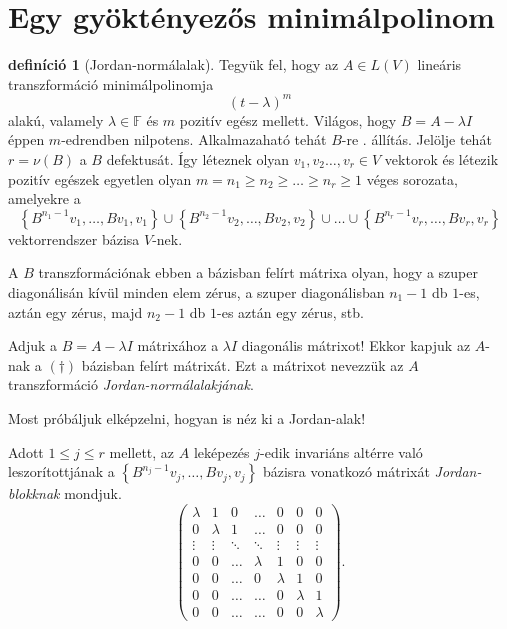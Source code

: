 \documentclass[a4paper, showtrims]{memoir}
\theoremstyle{plain}
\theoremstyle{remark}
\theoremstyle{definition}
\newtheorem{definition}[proposition]{definíció}
\begin{document}
\section{Egy gyöktényezős minimálpolinom}
\begin{definition}[Jordan-normálalak]
	Tegyük fel, hogy az $A\in L\left( V \right)$ lineáris transzformáció
	minimálpolinomja
	\[
		\left( t-\lambda \right)^m
	\]
	alakú, valamely $\lambda\in\mathbb{F}$ és $m$ pozitív egész mellett.
	Világos, hogy $B=A-\lambda I$ éppen $m$-edrendben nilpotens.
    Alkalmazaható tehát $B$-re . állítás.
	Jelölje tehát $r=\nu\left( B \right)$ a $B$ defektusát.
	Így léteznek olyan $v_1,v_2\dots,v_r\in V$ vektorok és
	létezik pozitív egészek egyetlen olyan $m=n_1\geq n_2\geq \dots\geq n_r\geq 1$ véges sorozata,
	amelyekre a
	\[
		\left\{ B^{n_1-1}v_1,\ldots,Bv_1,v_1 \right\}
		\cup
		\left\{ B^{n_2-1}v_2,\ldots,Bv_2,v_2 \right\}
		\cup
		\ldots
		\cup
		\left\{ B^{n_r-1}v_r,\ldots,Bv_r,v_r \right\}
		\tag{\dag}
	\]
	vektorrendszer bázisa $V$-nek.

	A $B$ transzformációnak ebben a bázisban felírt mátrixa olyan, hogy
	a szuper diagonálisán kívül minden elem zérus,
	a szuper diagonálisban $n_1-1$ db $1$-es, aztán egy zérus, majd $n_2-1$ db $1$-es aztán egy zérus, stb.

	Adjuk a $B=A-\lambda I$ mátrixához a $\lambda I$ diagonális mátrixot!
	Ekkor kapjuk az $A$-nak a $(\dag)$ bázisban felírt mátrixát.
	Ezt a mátrixot nevezzük az $A$ transzformáció \emph{Jordan-normálalakjának}.
\end{definition}
Most próbáljuk elképzelni, hogyan is néz ki a Jordan-alak!

Adott $1\leq j\leq r$ mellett,
az $A$ leképezés $j$-edik invariáns altérre való leszorítottjának a
\begin{math}
	\left\{ B^{n_j-1}v_j,\ldots,Bv_j,v_j \right\}
\end{math}
bázisra vonatkozó mátrixát \emph{Jordan-blokknak} mondjuk.
\[
	\begin{pmatrix}
		\lambda & 1       & 0      & \dots   & 0       & 0       & 0       \\
		0       & \lambda & 1      & \dots   & 0       & 0       & 0       \\
		\vdots  & \vdots  & \ddots & \ddots  & \vdots  & \vdots  & \vdots  \\
		0       & 0       & \dots  & \lambda & 1       & 0       & 0       \\
		0       & 0       & \dots  & 0       & \lambda & 1       & 0       \\
		0       & 0       & \dots  & \dots   & 0       & \lambda & 1       \\
		0       & 0       & \dots  & \dots   & 0       & 0       & \lambda
	\end{pmatrix}.
\]
\end{document}
